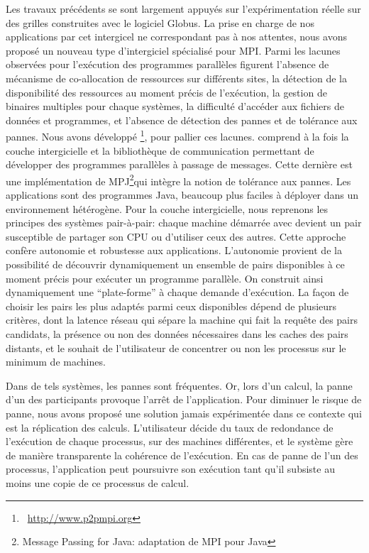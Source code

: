 Les travaux  précédents se sont  largement appuyés sur  l'expérimentation réelle
sur des grilles construites  avec le logiciel Globus. La prise  en charge de nos
applications par cet intergicel ne correspondant  pas à nos attentes, nous avons
proposé un  nouveau type  d'intergiciel spécialisé pour  MPI. Parmi  les lacunes
observées  pour  l'exécution des  programmes  parallèles  figurent l'absence  de
mécanisme de co-allocation  de ressources sur différents sites,  la détection de
la disponibilité des  ressources au moment précis de l'exécution,  la gestion de
binaires multiples pour chaque systèmes, la difficulté d'accéder aux fichiers de
données et programmes, et l'absence de  détection des pannes et de tolérance aux
pannes.  Nous  avons  développé  {\pmpi}\footnote{~\url{http://www.p2pmpi.org}},
pour pallier ces lacunes. {\pmpi} comprend  à la fois la couche intergicielle et
la  bibliothèque  de  communication  permettant  de  développer  des  programmes
parallèles  à passage  de messages.  Cette  dernière est  une implémentation  de
MPJ\footnote{Message Passing for  Java: adaptation de MPI  pour Java}qui intègre
la notion  de tolérance aux pannes.  Les applications sont des  programmes Java,
beaucoup  plus faciles  à déployer  dans un  environnement hétérogène.   Pour la
couche  intergicielle, nous  reprenons les  principes des  systèmes pair-à-pair:
chaque machine démarrée avec {\pmpi} devient un pair susceptible de partager son
CPU  ou  d'utiliser  ceux  des  autres.  Cette  approche  confère  autonomie  et
robustesse aux applications. L'autonomie provient de la possibilité de découvrir
dynamiquement un ensemble de pairs disponibles  à ce moment précis pour exécuter
un programme parallèle.  On construit ainsi dynamiquement  une ``plate-forme'' à
chaque demande d'exécution. La façon de choisir les pairs les plus adaptés parmi
ceux disponibles dépend de plusieurs critères, dont la latence réseau qui sépare
la machine  qui fait  la requête  des pairs  candidats, la  présence ou  non des
données  nécessaires dans  les  caches  des pairs  distants,  et  le souhait  de
l'utilisateur de concentrer ou non les processus sur le minimum de machines.

Dans de tels systèmes, les pannes sont fréquentes. Or, lors d'un calcul, la 
panne d'un des participants provoque l'arrêt de l'application. Pour diminuer le 
risque de panne, nous avons proposé une solution jamais expérimentée dans ce 
contexte qui est la réplication des calculs. L'utilisateur décide du taux de 
redondance de l'exécution de chaque processus, sur des machines différentes, et 
le système gère de manière transparente la cohérence de l'exécution. En cas de 
panne de l'un des processus, l'application peut poursuivre son exécution tant 
qu'il subsiste au moins une copie de ce processus de calcul.\\


